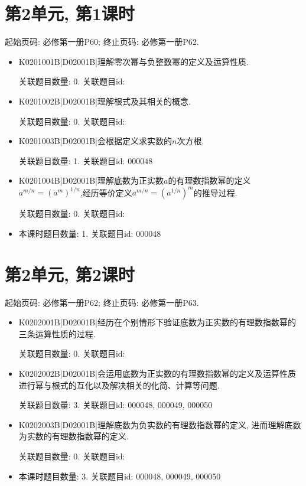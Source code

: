 \section*{第2单元, 第1课时}
起始页码: 必修第一册P60; 终止页码: 必修第一册P62.
\begin{itemize}
\item K0201001B|D02001B|理解零次幂与负整数幂的定义及运算性质.

关联题目数量: 0. 关联题目id: 

\item K0201002B|D02001B|理解根式及其相关的概念.

关联题目数量: 0. 关联题目id: 

\item K0201003B|D02001B|会根据定义求实数的$n$次方根.

关联题目数量: 1. 关联题目id: 000048

\item K0201004B|D02001B|理解底数为正实数$a$的有理数指数幂的定义$a^{m/n}=(a^{m})^{1/n}$,经历等价定义$a^{m/n}= (a^{1/n})^{m}$的推导过程.

关联题目数量: 0. 关联题目id: 

\item 本课时题目数量: 1. 关联题目id: 000048

\end{itemize}

\section*{第2单元, 第2课时}
起始页码: 必修第一册P62; 终止页码: 必修第一册P63.
\begin{itemize}
\item K0202001B|D02001B|经历在个别情形下验证底数为正实数的有理数指数幂的三条运算性质的过程.

关联题目数量: 0. 关联题目id: 

\item K0202002B|D02001B|会运用底数为正实数的有理数指数幂的定义及运算性质进行幂与根式的互化以及解决相关的化简、计算等问题.

关联题目数量: 3. 关联题目id: 000048, 000049, 000050

\item K0202003B|D02001B|理解底数为负实数的有理数指数幂的定义, 进而理解底数为实数的有理数指数幂的定义.

关联题目数量: 0. 关联题目id: 

\item 本课时题目数量: 3. 关联题目id: 000048, 000049, 000050

\end{itemize}

